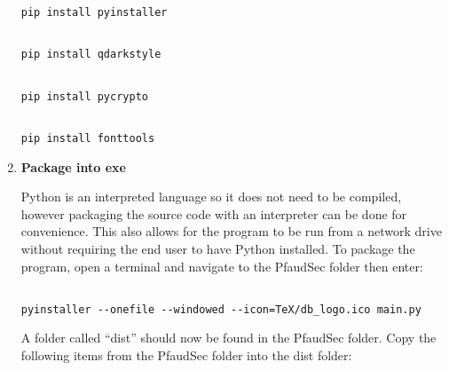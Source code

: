 \documentclass[14pt]{article}
\begin{document}
\begin{flushleft}
\begin{enumerate}
\begin{tcolorbox}[boxrule=0.5pt, colback=backgrey, colframe=bordergrey, sharpish corners]
\begin{verbatim}
pip install pyinstaller

\end{verbatim}
\end{tcolorbox}

\begin{tcolorbox}[boxrule=0.5pt, colback=backgrey, colframe=bordergrey, sharpish corners] 
\begin{verbatim}

pip install qdarkstyle

\end{verbatim}
\end{tcolorbox}


\begin{tcolorbox}[boxrule=0.5pt, colback=backgrey, colframe=bordergrey, sharpish corners] 
\begin{verbatim}

pip install pycrypto

\end{verbatim}
\end{tcolorbox}


\begin{tcolorbox}[boxrule=0.5pt, colback=backgrey, colframe=bordergrey, sharpish corners] 
\begin{verbatim}

pip install fonttools

\end{verbatim}
\end{tcolorbox}

\item \textbf{Package into exe}

Python is an interpreted language so it does not need to be compiled, however packaging the source code with an interpreter can be done for convenience.
This also allows for the program to be run from a network drive without requiring the end user to have Python installed.
To package the program, open a terminal and navigate to the PfaudSec folder then enter:

\begin{tcolorbox}[boxrule=0.5pt, colback=backgrey, colframe=bordergrey, sharpish corners] 
\begin{verbatim}

pyinstaller --onefile --windowed --icon=TeX/db_logo.ico main.py

\end{verbatim}
\end{tcolorbox}

A folder called ``dist'' should now be found in the PfaudSec folder.
Copy the following items from the PfaudSec folder into the dist folder:


\end{enumerate}
\end{flushleft}
\end{document}
